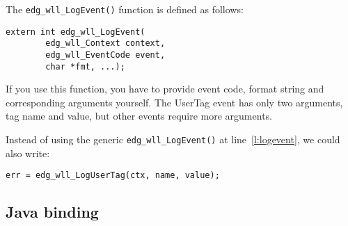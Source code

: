 The \verb'edg_wll_LogEvent()' function is defined as follows:
\begin{lstlisting}[numbers=none]
extern int edg_wll_LogEvent(
        edg_wll_Context context,
        edg_wll_EventCode event,
        char *fmt, ...);
\end{lstlisting}
If you use this function, you have to provide event code, format
string and corresponding arguments yourself. The UserTag event has
only two arguments, tag name and value, but other events require more
arguments.

Instead of using the generic \verb'edg_wll_LogEvent()' at line~\ref{l:logevent}, we could also
write:
\begin{lstlisting}
err = edg_wll_LogUserTag(ctx, name, value);
\end{lstlisting}

\subsection{Java binding}

